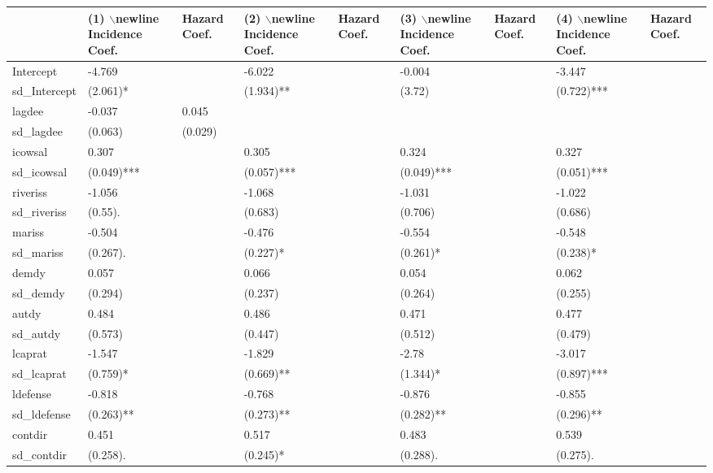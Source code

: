 \begin{table}[ht]
\centering
\begin{tabular}{lllllllll}
  \hline
  & (1) $\backslash$newline Incidence Coef. &  Hazard Coef. & (2) $\backslash$newline Incidence Coef. &  Hazard Coef. & (3) $\backslash$newline Incidence Coef. &  Hazard Coef. & (4) $\backslash$newline Incidence Coef. &  Hazard Coef. \\ 
  \hline
Intercept & -4.769 &  & -6.022 &  & -0.004 &  & -3.447 &  \\ 
  sd\_Intercept & (2.061)* &  & (1.934)** &  & (3.72)  &  & (0.722)*** &  \\ 
  lagdee & -0.037 & 0.045 &  &  &  &  &  &  \\ 
  sd\_lagdee & (0.063)  & (0.029)  &  &  &  &  &  &  \\ 
  icowsal & 0.307 &  & 0.305 &  & 0.324 &  & 0.327 &  \\ 
  sd\_icowsal & (0.049)*** &  & (0.057)*** &  & (0.049)*** &  & (0.051)*** &  \\ 
  riveriss & -1.056 &  & -1.068 &  & -1.031 &  & -1.022 &  \\ 
  sd\_riveriss & (0.55). &  & (0.683)  &  & (0.706)  &  & (0.686)  &  \\ 
  mariss & -0.504 &  & -0.476 &  & -0.554 &  & -0.548 &  \\ 
  sd\_mariss & (0.267). &  & (0.227)* &  & (0.261)* &  & (0.238)* &  \\ 
  demdy & 0.057 &  & 0.066 &  & 0.054 &  & 0.062 &  \\ 
  sd\_demdy & (0.294)  &  & (0.237)  &  & (0.264)  &  & (0.255)  &  \\ 
  autdy & 0.484 &  & 0.486 &  & 0.471 &  & 0.477 &  \\ 
  sd\_autdy & (0.573)  &  & (0.447)  &  & (0.512)  &  & (0.479)  &  \\ 
  lcaprat & -1.547 &  & -1.829 &  & -2.78 &  & -3.017 &  \\ 
  sd\_lcaprat & (0.759)* &  & (0.669)** &  & (1.344)* &  & (0.897)*** &  \\ 
  ldefense & -0.818 &  & -0.768 &  & -0.876 &  & -0.855 &  \\ 
  sd\_ldefense & (0.263)** &  & (0.273)** &  & (0.282)** &  & (0.296)** &  \\ 
  contdir & 0.451 &  & 0.517 &  & 0.483 &  & 0.539 &  \\ 
  sd\_contdir & (0.258). &  & (0.245)* &  & (0.288). &  & (0.275). &  \\ 

\end{tabular}
\end{table}
